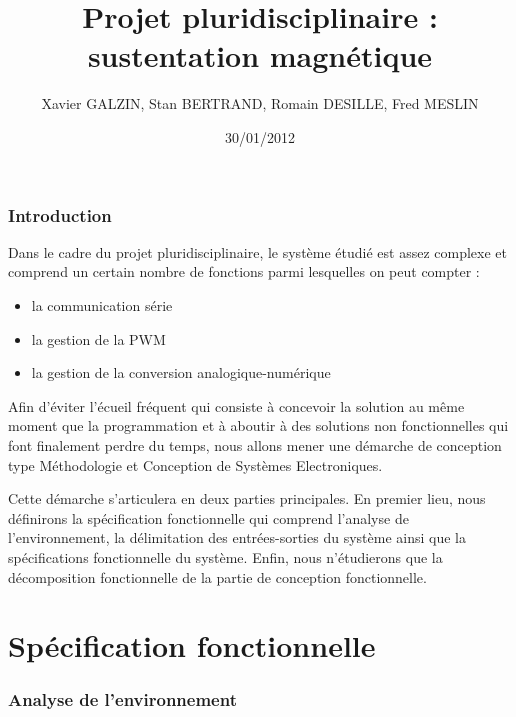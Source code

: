 \documentclass[11pt,french]{article} %
\title{Projet pluridisciplinaire : sustentation magnétique}
\author{ Xavier GALZIN, Stan BERTRAND, Romain DESILLE, Fred MESLIN}
\date{30/01/2012}
\begin{document}
\maketitle
\pagebreak

\section*{Introduction}

Dans le cadre du projet pluridisciplinaire, le système étudié est assez complexe et comprend un certain nombre de fonctions parmi lesquelles on peut compter : 

\vspace{0.1cm}

\begin{itemize}
\item{la communication série}
\item{la gestion de la PWM}
\item{la gestion de la conversion analogique-numérique}
\end{itemize}

\vspace{0.3cm}

Afin d'éviter l'écueil fréquent qui consiste à concevoir la solution au même moment que la programmation et à aboutir à des solutions non fonctionnelles qui font finalement perdre du temps, nous allons mener une démarche de conception type Méthodologie et Conception de Systèmes Electroniques. 

\vspace{0.3cm}

Cette démarche s'articulera en deux parties principales. En premier lieu, nous définirons la spécification fonctionnelle qui comprend l'analyse de l'environnement, la délimitation des entrées-sorties du système ainsi que la spécifications fonctionnelle du système. Enfin, nous n'étudierons que la décomposition fonctionnelle de la partie de conception fonctionnelle. 

\pagebreak


\part{Spécification fonctionnelle}

\setcounter{section}{0}

\section{Analyse de l'environnement}
\end{document}
